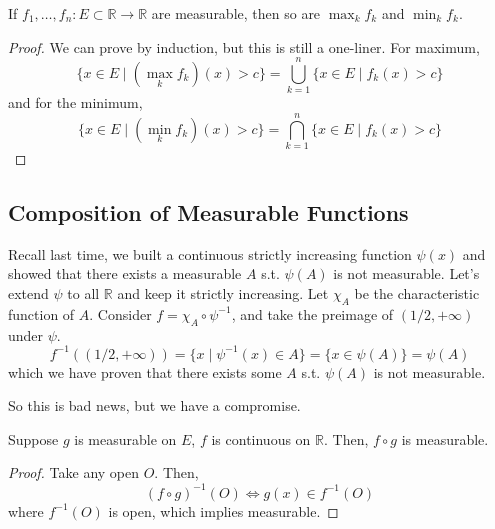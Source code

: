   \begin{theorem}
    If $f_1, \ldots, f_n: E \subset \mathbb{R} \to \mathbb{R}$ are measurable, then so are $\max_k f_k$ and $\min_k f_k$. 
  \end{theorem}
  \begin{proof}
    We can prove by induction, but this is still a one-liner. For maximum, 
    \begin{equation}
      \{x \in E \mid (\max_k{f_k})(x) > c \} = \bigcup_{k=1}^n \{x \in E \mid f_k (x) > c\} 
    \end{equation}
    and for the minimum, 
    \begin{equation}
      \{x \in E \mid (\min_k{f_k})(x) > c \} = \bigcap_{k=1}^n \{x \in E \mid f_k (x) > c\} 
    \end{equation}
  \end{proof} 

\subsection{Composition of Measurable Functions}

  \begin{example}
    Recall last time, we built a continuous strictly increasing function $\psi(x)$ and showed that there exists a measurable $A$ s.t. $\psi(A)$ is not measurable. Let's extend $\psi$ to all $\mathbb{R}$ and keep it strictly increasing. Let $\chi_A$ be the characteristic function of $A$. Consider $f = \chi_A \circ \psi^{-1}$, and take the preimage of $(1/2, +\infty)$ under $\psi$. 
    \begin{equation}
      f^{-1} ((1/2, +\infty)) = \{x \mid \psi^{-1} (x) \in A \}  = \{x \in \psi(A)\} = \psi(A)
    \end{equation}
    which we have proven  that there exists some $A$ s.t. $\psi(A)$ is not measurable. 
  \end{example}

  So this is bad news, but we have a compromise. 

  \begin{theorem}
    Suppose $g$ is measurable on $E$, $f$ is continuous on $\mathbb{R}$. Then, $f \circ g$ is measurable. 
  \end{theorem}
  \begin{proof}
    Take any open $O$. Then, 
    \begin{equation}
      (f \circ g)^{-1} (O) \iff g(x) \in f^{-1} (O) 
    \end{equation}
    where $f^{-1} (O)$ is open, which implies measurable. 
  \end{proof}

